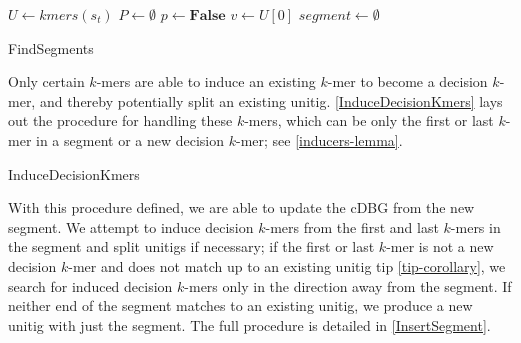 \documentclass[preprint,number,12pt]{elsarticle}
\begin{document}
\begin{algorithm}[]
	\DontPrintSemicolon
	$U \longleftarrow kmers(s_t)$\;
	$P \longleftarrow \emptyset$\;
	$p \longleftarrow \bm{False}$\;
	$v \longleftarrow U[0]$\;
	$segment \longleftarrow \emptyset$\;
	\Return{$\ell, \delta$}
\caption{FindSegments\label{FindSegments}}
\end{algorithm}

Only certain $k$-mers are able to induce an existing $k$-mer to become a decision $k$-mer, and thereby potentially split an existing unitig. \ref{InduceDecisionKmers} lays out the procedure for handling these $k$-mers, which can be only the first or last $k$-mer in a segment or a new decision $k$-mer; see \ref{inducers-lemma}.

\begin{algorithm}
	\DontPrintSemicolon
\caption{InduceDecisionKmers}\label{InduceDecisionKmers}
\end{algorithm}

With this procedure defined, we are able to update the cDBG from the new segment. We attempt to induce decision $k$-mers from the first and last $k$-mers in the segment and split unitigs if necessary; if the first or last $k$-mer is not a new decision $k$-mer and does not match up to an existing unitig tip \ref{tip-corollary}, we search for induced decision $k$-mers only in the direction away from the segment.
If neither end of the segment matches to an existing unitig, we produce a new unitig with just the segment. The full procedure is detailed in \ref{InsertSegment}.
\end{document}
